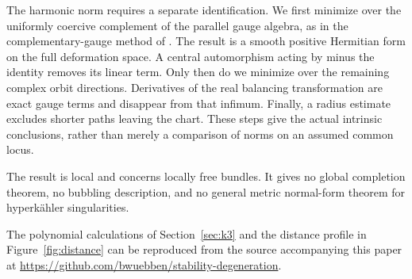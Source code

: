The harmonic norm requires a separate identification. We first minimize
over the uniformly coercive complement of the parallel gauge algebra,
as in the complementary-gauge method of \cite{Wue26b}. The result is a
smooth positive Hermitian form on the full deformation space. A central
automorphism acting by minus the identity removes its linear term.
Only then do we minimize over the remaining complex orbit directions.
Derivatives of the real balancing transformation are exact gauge terms
and disappear from that infimum. Finally, a radius estimate excludes
shorter paths leaving the chart. These steps give the actual intrinsic
conclusions, rather than merely a comparison of norms on an assumed
common locus.

The result is local and concerns locally free bundles. It gives no
global completion theorem, no bubbling description, and no general
metric normal-form theorem for hyperk\"ahler singularities.

The polynomial calculations of Section~\ref{sec:k3} and the distance
profile in Figure~\ref{fig:distance} can be reproduced from the
source accompanying this paper at
\url{https://github.com/bwuebben/stability-degeneration}.
